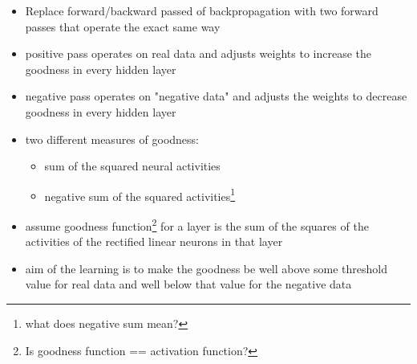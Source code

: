 \begin{itemize}
    \item Replace forward/backward passed of backpropagation with two forward passes that operate the exact same way
    \item positive pass operates on real data and adjusts weights to increase the goodness in every hidden layer
    \item negative pass operates on "negative data" and adjusts the weights to decrease goodness in every hidden layer
    \item two different measures of goodness:
    \begin{itemize}
        \item sum of the squared neural activities
        \item negative sum of the squared activities\footnote{what does negative sum mean?}
    \end{itemize}

    \item assume goodness function\footnote{Is goodness function == activation function?} for a layer is the sum of the squares of the activities of the rectified linear neurons in that layer
    \item aim of the learning is to make the goodness be well above some threshold value for real data and well below that value for the negative data

\end{itemize}

